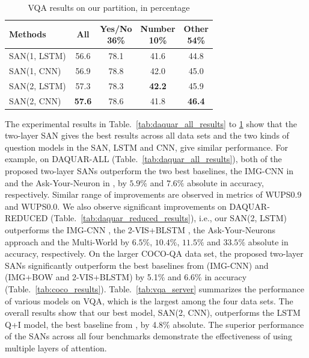 \documentclass[10pt,twocolumn,letterpaper]{article}
\begin{document}
\begin{table}
  \centering
  \begin{tabular}{l  c c c c}
    \toprule
    Methods & All & \shortstack{Yes/No\\ 36\%} & \shortstack{Number\\ 10\%} &
                                                                              \shortstack{Other\\ 54\%}\\
    \midrule
    SAN(1, LSTM) & 56.6 & 78.1 & 41.6 & 44.8\\
    SAN(1, CNN) & 56.9 & 78.8 & 42.0 & 45.0\\
    SAN(2, LSTM) & 57.3 & 78.3 & {\bf 42.2} & 45.9\\
    SAN(2, CNN)& {\bf 57.6} & 78.6 & 41.8 & {\bf 46.4}\\
    \bottomrule
  \end{tabular}
  \caption{VQA results on our partition, in percentage}
\label{tab:vqa}
\vspace{-0.6cm}
\end{table}



The experimental results in Table.~\ref{tab:daquar_all_results} to
\ref{tab:vqa} show that the two-layer SAN gives the best results across all
data sets and the two kinds of question models in the SAN, LSTM and CNN, give
similar performance. For example, on DAQUAR-ALL
(Table.~\ref{tab:daquar_all_results}), both of the proposed two-layer SANs
outperform the two best baselines, the IMG-CNN in \cite{ma2015learning} and the
Ask-Your-Neuron in \cite{malinowski2015ask}, by $5.9\%$ and $7.6\%$ absolute in
accuracy, respectively. Similar range of improvements are observed in metrics
of WUPS0.9 and WUPS0.0. We also observe significant improvements on
DAQUAR-REDUCED (Table.~\ref{tab:daquar_reduced_results}), i.e., our SAN(2,
LSTM) outperforms the IMG-CNN \cite{ma2015learning}, the 2-VIS+BLSTM
\cite{ren2015imageqa}, the Ask-Your-Neurons approach \cite{malinowski2015ask}
and the Multi-World \cite{malinowski2014multi} by $6.5\%$, $10.4\%$, $11.5\%$
and $33.5\%$ absolute in accuracy, respectively. On the larger COCO-QA data
set, the proposed two-layer SANs significantly outperform the best baselines
from \cite{ma2015learning} (IMG-CNN) and \cite{ren2015imageqa} (IMG+BOW and
2-VIS+BLSTM) by 5.1\% and 6.6\% in accuracy
(Table.~\ref{tab:coco_results}). Table.~\ref{tab:vqa_server} summarizes the
performance of various models on VQA, which is the largest among the four data
sets. The overall results show that our best model, SAN(2, CNN), outperforms
the LSTM Q+I model, the best baseline from \cite{antol2015vqa}, by 4.8\%
absolute. The superior performance of the SANs across all four benchmarks
demonstrate the effectiveness of using multiple layers of attention.
\end{document}
